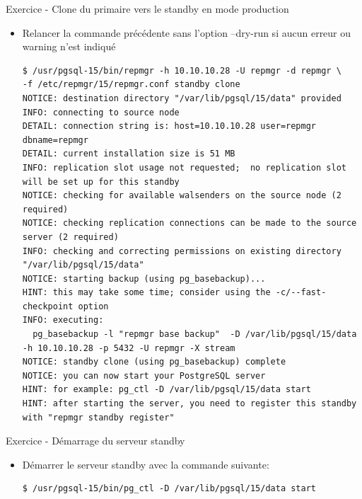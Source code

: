 \begin{frame}[fragile]{Exercice - Clone du primaire vers le standby en mode production}

   \begin{itemize}
      \item Relancer la commande précédente sans l'option --dry-run si aucun erreur ou warning n'est indiqué
\begin{tiny}
\begin{Verbatim}[commandchars=\&\{\}]
$ /usr/pgsql-15/bin/repmgr -h 10.10.10.28 -U repmgr -d repmgr \
-f /etc/repmgr/15/repmgr.conf standby clone
NOTICE: destination directory "/var/lib/pgsql/15/data" provided
INFO: connecting to source node
DETAIL: connection string is: host=10.10.10.28 user=repmgr dbname=repmgr
DETAIL: current installation size is 51 MB
INFO: replication slot usage not requested;  no replication slot will be set up for this standby                                                                                             
NOTICE: checking for available walsenders on the source node (2 required)
NOTICE: checking replication connections can be made to the source server (2 required)
INFO: checking and correcting permissions on existing directory "/var/lib/pgsql/15/data"
NOTICE: starting backup (using pg_basebackup)...
HINT: this may take some time; consider using the -c/--fast-checkpoint option
INFO: executing:
  pg_basebackup -l "repmgr base backup"  -D /var/lib/pgsql/15/data -h 10.10.10.28 -p 5432 -U repmgr -X stream                                                                                
NOTICE: standby clone (using pg_basebackup) complete
NOTICE: you can now start your PostgreSQL server
HINT: for example: pg_ctl -D /var/lib/pgsql/15/data start
HINT: after starting the server, you need to register this standby with "repmgr standby register"
\end{Verbatim}
\end{tiny}
   \end{itemize}

\end{frame}


\begin{frame}[fragile]{Exercice - Démarrage du serveur standby}

   \begin{itemize}
      \item Démarrer le serveur standby avec la commande suivante:
\begin{tiny}
\begin{Verbatim}[commandchars=\&\{\}]
$ /usr/pgsql-15/bin/pg_ctl -D /var/lib/pgsql/15/data start
\end{Verbatim}
\end{tiny}
   \end{itemize}

\end{frame}

